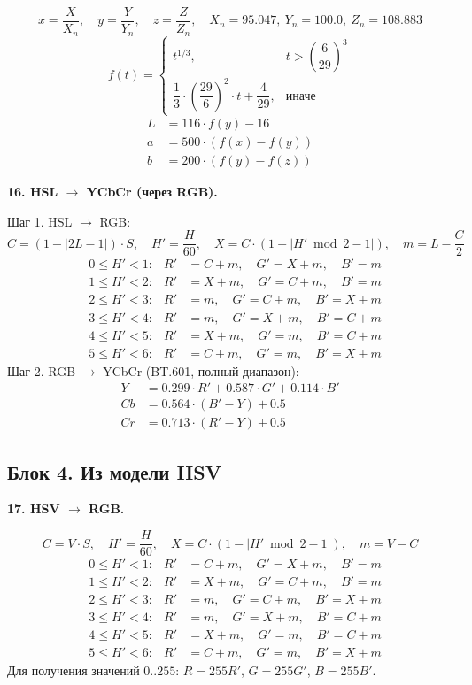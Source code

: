\documentclass[12pt,a4paper]{article}
\begin{document}
\[
x = \frac{X}{X_n},\quad y = \frac{Y}{Y_n},\quad z = \frac{Z}{Z_n},\quad X_n = 95.047,\ Y_n = 100.0,\ Z_n = 108.883
\]
\[
f(t) = \begin{cases} t^{1/3}, & t > \left(\dfrac{6}{29}\right)^3 \\[8pt] \dfrac{1}{3} \cdot \left(\dfrac{29}{6}\right)^2 \cdot t + \dfrac{4}{29}, & \text{иначе} \end{cases}
\]
\begin{align*}
L &= 116 \cdot f(y) - 16 \\
a &= 500 \cdot (f(x) - f(y)) \\
b &= 200 \cdot (f(y) - f(z))
\end{align*}

\textbf{16. HSL \(\to\) YCbCr (через RGB).}

Шаг 1. HSL \(\to\) RGB:
\[
C = (1 - |2L - 1|) \cdot S,\quad H' = \frac{H}{60},\quad X = C \cdot (1 - |H' \bmod 2 - 1|),\quad m = L - \frac{C}{2}
\]
\begin{align*}
&0 \le H' < 1: & R' &= C + m,\quad G' = X + m,\quad B' = m \\
&1 \le H' < 2: & R' &= X + m,\quad G' = C + m,\quad B' = m \\
&2 \le H' < 3: & R' &= m,\quad G' = C + m,\quad B' = X + m \\
&3 \le H' < 4: & R' &= m,\quad G' = X + m,\quad B' = C + m \\
&4 \le H' < 5: & R' &= X + m,\quad G' = m,\quad B' = C + m \\
&5 \le H' < 6: & R' &= C + m,\quad G' = m,\quad B' = X + m
\end{align*}
Шаг 2. RGB \(\to\) YCbCr (BT.601, полный диапазон):
\begin{align*}
Y &= 0.299 \cdot R' + 0.587 \cdot G' + 0.114 \cdot B' \\
Cb &= 0.564 \cdot (B' - Y) + 0.5 \\
Cr &= 0.713 \cdot (R' - Y) + 0.5
\end{align*}

\subsection{Блок 4. Из модели HSV}

\textbf{17. HSV \(\to\) RGB.}

\[
C = V \cdot S,\quad H' = \frac{H}{60},\quad X = C \cdot (1 - |H' \bmod 2 - 1|),\quad m = V - C
\]
\begin{align*}
&0 \le H' < 1: & R' &= C + m,\quad G' = X + m,\quad B' = m \\
&1 \le H' < 2: & R' &= X + m,\quad G' = C + m,\quad B' = m \\
&2 \le H' < 3: & R' &= m,\quad G' = C + m,\quad B' = X + m \\
&3 \le H' < 4: & R' &= m,\quad G' = X + m,\quad B' = C + m \\
&4 \le H' < 5: & R' &= X + m,\quad G' = m,\quad B' = C + m \\
&5 \le H' < 6: & R' &= C + m,\quad G' = m,\quad B' = X + m
\end{align*}
Для получения значений \(0..255\): \(R = 255 R'\), \(G = 255 G'\), \(B = 255 B'\).
\end{document}
